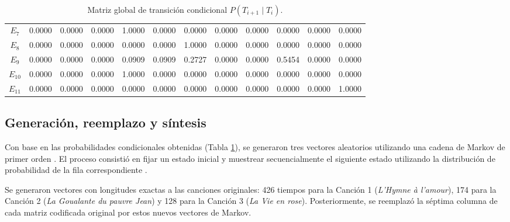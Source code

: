 \documentclass{article}
\theoremstyle{plain}
\theoremstyle{definition}
\begin{document}
\begin{table}[h!]
{\begin{tabular}{|c|ccccccccccc|}
			\textbf{$E_7$}                                     & 0.0000         & 0.0000         & 0.0000         & 1.0000         & 0.0000         & 0.0000         & 0.0000         & 0.0000         & 0.0000         & 0.0000            & 0.0000            \\
			\textbf{$E_8$}                                     & 0.0000         & 0.0000         & 0.0000         & 0.0000         & 0.0000         & 1.0000         & 0.0000         & 0.0000         & 0.0000         & 0.0000            & 0.0000            \\
			\textbf{$E_9$}                                     & 0.0000         & 0.0000         & 0.0000         & 0.0909         & 0.0909         & 0.2727         & 0.0000         & 0.0000         & 0.5454         & 0.0000            & 0.0000            \\
			\textbf{$E_{10}$}                                  & 0.0000         & 0.0000         & 0.0000         & 1.0000         & 0.0000         & 0.0000         & 0.0000         & 0.0000         & 0.0000         & 0.0000            & 0.0000            \\
			\textbf{$E_{11}$}                                  & 0.0000         & 0.0000         & 0.0000         & 0.0000         & 0.0000         & 0.0000         & 0.0000         & 0.0000         & 0.0000         & 0.0000            & 1.0000            \\ \hline
		\end{tabular}%
	}
	\caption{Matriz global de transición condicional $P(T_{i+1} \mid T_i)$.}
	\label{tab:matriz_transicion}
\end{table}

\subsection*{Generación, reemplazo y síntesis}
Con base en las probabilidades condicionales obtenidas (Tabla \ref{tab:matriz_transicion}), se generaron tres vectores aleatorios utilizando una cadena de Markov de primer orden \cite{markov_music}. El proceso consistió en fijar un estado inicial y muestrear secuencialmente el siguiente estado utilizando la distribución de probabilidad de la fila correspondiente \cite{nierhaus2009}.

Se generaron vectores con longitudes exactas a las canciones originales: 426 tiempos para la Canción 1 (\textit{L'Hymne à l'amour}), 174 para la Canción 2 (\textit{La Goualante du pauvre Jean}) y 128 para la Canción 3 (\textit{La Vie en rose}).
Posteriormente, se reemplazó la séptima columna de cada matriz codificada original por estos nuevos vectores de Markov.
\end{document}
